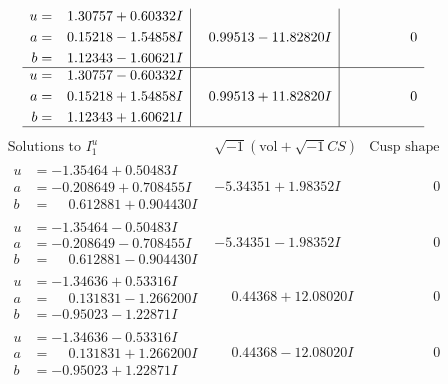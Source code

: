 \documentclass[1p]{elsarticle_modified}
\theoremstyle{definition}
\newcommand{\I}{\sqrt{-1}}
\begin{document}
$$\begin{array}{c|c|c}
\begin{aligned}
u &= \phantom{-}1.30757 + 0.60332 I \\
a &= \phantom{-}0.15218 - 1.54858 I \\
b &= \phantom{-}1.12343 - 1.60621 I\end{aligned}
 & \phantom{-}0.99513 - 11.82820 I & \phantom{-0.000000 } 0 \\ \hline\begin{aligned}
u &= \phantom{-}1.30757 - 0.60332 I \\
a &= \phantom{-}0.15218 + 1.54858 I \\
b &= \phantom{-}1.12343 + 1.60621 I\end{aligned}
 & \phantom{-}0.99513 + 11.82820 I & \phantom{-0.000000 } 0\\
 \hline 
 \end{array}$$\newpage$$\begin{array}{c|c|c}  
\text{Solutions to }I^u_{1}& \I (\text{vol} + \sqrt{-1}CS) & \text{Cusp shape}\\
 \hline 
\begin{aligned}
u &= -1.35464 + 0.50483 I \\
a &= -0.208649 + 0.708455 I \\
b &= \phantom{-}0.612881 + 0.904430 I\end{aligned}
 & -5.34351 + 1.98352 I & \phantom{-0.000000 } 0 \\ \hline\begin{aligned}
u &= -1.35464 - 0.50483 I \\
a &= -0.208649 - 0.708455 I \\
b &= \phantom{-}0.612881 - 0.904430 I\end{aligned}
 & -5.34351 - 1.98352 I & \phantom{-0.000000 } 0 \\ \hline\begin{aligned}
u &= -1.34636 + 0.53316 I \\
a &= \phantom{-}0.131831 - 1.266200 I \\
b &= -0.95023 - 1.22871 I\end{aligned}
 & \phantom{-}0.44368 + 12.08020 I & \phantom{-0.000000 } 0 \\ \hline\begin{aligned}
u &= -1.34636 - 0.53316 I \\
a &= \phantom{-}0.131831 + 1.266200 I \\
b &= -0.95023 + 1.22871 I\end{aligned}
 & \phantom{-}0.44368 - 12.08020 I & \phantom{-0.000000 } 0 \\ \hline\begin{aligned}

\end{aligned}
\end{array}$$
\end{document}
